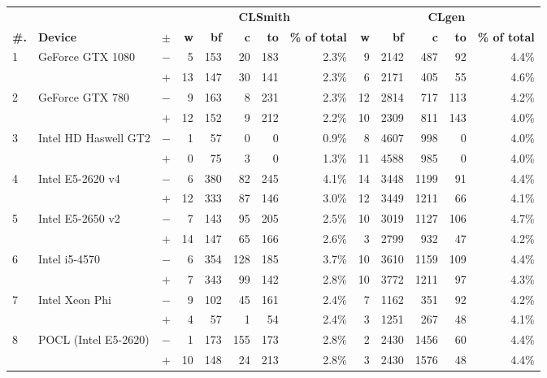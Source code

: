   \begin{tabular}{lll | rrrrr | rrrrr }
  \toprule
  & & & \multicolumn{5}{c|}{\textbf{CLSmith}} & \multicolumn{5}{c}{\textbf{CLgen}} \\
  \textbf{\#.} & \textbf{Device} & $\pm$ &
  \textbf{w} & \textbf{bf} & \textbf{c} & \textbf{to} & \textbf{\% of total} &
  \textbf{w} & \textbf{bf} & \textbf{c} & \textbf{to} & \textbf{\% of total} \\
  \midrule
  \multirow{ 2}{*}{1} & \multirow{ 2}{*}{GeForce GTX 1080} & $-$ & 5 & 153 & 20 & 183 & 2.3\%       & 9 & 2142 & 487 & 92 & 4.4\% \\& & $+$ & 13 & 147 & 30 & 141 & 2.3\% & 6 & 2171 & 405 & 55 & 4.6\% \\
\hline
\multirow{ 2}{*}{2} & \multirow{ 2}{*}{GeForce GTX 780} & $-$ & 9 & 163 & 8 & 231 & 2.3\%       & 12 & 2814 & 717 & 113 & 4.2\% \\& & $+$ & 12 & 152 & 9 & 212 & 2.2\% & 10 & 2309 & 811 & 143 & 4.0\% \\
\hline
\multirow{ 2}{*}{3} & \multirow{ 2}{*}{Intel HD Haswell GT2} & $-$ & 1 & 57 & 0 & 0 & 0.9\%       & 8 & 4607 & 998 & 0 & 4.0\% \\& & $+$ & 0 & 75 & 3 & 0 & 1.3\% & 11 & 4588 & 985 & 0 & 4.0\% \\
\hline
\multirow{ 2}{*}{4} & \multirow{ 2}{*}{Intel E5-2620 v4} & $-$ & 6 & 380 & 82 & 245 & 4.1\%       & 14 & 3448 & 1199 & 91 & 4.4\% \\& & $+$ & 12 & 333 & 87 & 146 & 3.0\% & 12 & 3449 & 1211 & 66 & 4.1\% \\
\hline
\multirow{ 2}{*}{5} & \multirow{ 2}{*}{Intel E5-2650 v2} & $-$ & 7 & 143 & 95 & 205 & 2.5\%       & 10 & 3019 & 1127 & 106 & 4.7\% \\& & $+$ & 14 & 147 & 65 & 166 & 2.6\% & 3 & 2799 & 932 & 47 & 4.2\% \\
\hline
\multirow{ 2}{*}{6} & \multirow{ 2}{*}{Intel i5-4570} & $-$ & 6 & 354 & 128 & 185 & 3.7\%       & 10 & 3610 & 1159 & 109 & 4.4\% \\& & $+$ & 7 & 343 & 99 & 142 & 2.8\% & 10 & 3772 & 1211 & 97 & 4.3\% \\
\hline
\multirow{ 2}{*}{7} & \multirow{ 2}{*}{Intel Xeon Phi} & $-$ & 9 & 102 & 45 & 161 & 2.4\%       & 7 & 1162 & 351 & 92 & 4.2\% \\& & $+$ & 4 & 57 & 1 & 54 & 2.4\% & 3 & 1251 & 267 & 48 & 4.1\% \\
\hline
\multirow{ 2}{*}{8} & \multirow{ 2}{*}{POCL (Intel E5-2620)} & $-$ & 1 & 173 & 155 & 173 & 2.8\%       & 2 & 2430 & 1456 & 60 & 4.4\% \\& & $+$ & 10 & 148 & 24 & 213 & 2.8\% & 3 & 2430 & 1576 & 48 & 4.4\% \\

\end{tabular}
